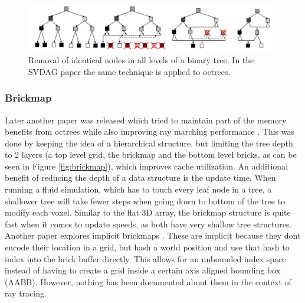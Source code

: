 \begin{figure}
    \centering
    \includegraphics[width=\linewidth]{figures/DAG_node_deduplication.png}
    \caption{Removal of identical nodes in all levels of a binary tree. In the SVDAG paper the same technique is applied to octrees. \cite{kampe2013high}}
    \label{fig:DAG_node_deduplication}
\end{figure}
\subsubsection{Brickmap} \label{introduction:voxel_data_structures:brickmap}
Later another paper was released which tried to maintain part of the memory benefits from octrees while also improving ray marching performance \cite{van2015real}. This was done by keeping the idea of a hierarchical structure, but limiting the tree depth to 2 layers (a top level grid, the brickmap and the bottom level bricks, as can be seen in Figure \ref{fig:brickmap}), which improves cache utilization. An additional benefit of reducing the depth of a data structure is the update time. When running a fluid simulation, which has to touch every leaf node in a tree, a shallower tree will take fewer steps when going down to bottom of the tree to modify each voxel. Similar to the flat 3D array, the brickmap structure is quite fast when it comes to update speeds, as both have very shallow tree structures. Another paper explores implicit brickmaps \cite{niessner2013real}. These are implicit because they dont encode their location in a grid, but hash a world position and use that hash to index into the brick buffer directly. This allows for an unbounded index space instead of having to create a grid inside a certain axis aligned bounding box (AABB). However, nothing has been documented about them in the context of ray tracing.


